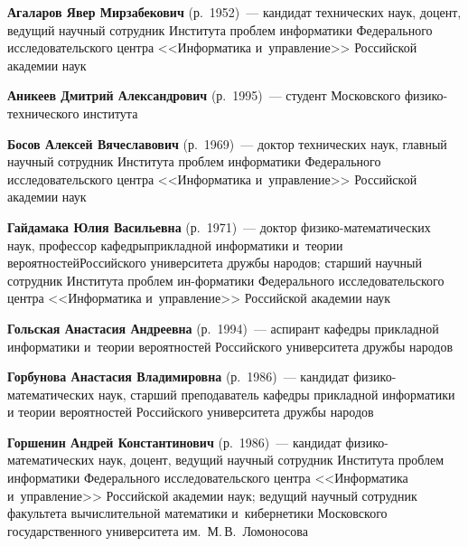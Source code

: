\begin{multicols}{2}

\noindent
\textbf{Агаларов Явер Мирзабекович} (р.\ 1952)~--- кандидат технических наук,
 доцент, ведущий научный сотрудник 
 Института проб\-лем информатики Федерального исследовательского центра 
<<Информатика и~управ\-ле\-ние>> Российской академии наук

\vspace*{6pt}

\noindent
\textbf{Аникеев Дмитрий Александрович} (р.\ 1995)~---  
студент Московского фи\-зи\-ко-тех\-ни\-че\-ско\-го института

\vspace*{6pt}


\noindent
\textbf{Босов Алексей Вячеславович} (р.\ 1969)~--- доктор технических наук, 
главный научный 
со\-труд\-ник Института проб\-лем информатики Федерального исследовательского центра 
<<Информатика и~управ\-ле\-ние>> Российской академии наук 

\vspace*{6pt}

\noindent
\textbf{Гайдамака Юлия Васильевна} (р.\ 1971)~--- доктор 
фи\-зи\-ко-ма\-те\-ма\-ти\-че\-ских наук, профессор кафед\-ры\linebreak прикладной информатики 
и~тео\-рии вероятностей\linebreak Российского университета дружбы народов; 
старший научный со\-труд\-ник Ин\-сти\-ту\-та проб\-лем ин-\linebreak форматики Федерального 
исследовательского цент\-ра <<Информатика и~управ\-ле\-ние>> Российской академии наук

\vspace*{6pt}

\noindent
\textbf{Гольская Анастасия Андреевна} (р.\ 1994)~--- 
аспирант кафедры прикладной информатики и~тео\-рии 
вероятностей Российского университета дружбы на\-родов

\vspace*{6pt}



\noindent
\textbf{Горбунова Анастасия Владимировна} (р.\ 1986)~--- 
кандидат фи\-зи\-ко-ма\-те\-ма\-ти\-че\-ских наук, старший преподаватель 
кафедры прикладной информатики и теории вероятностей Российского университета 
дружбы народов

\vspace*{6pt}

\noindent
\textbf{Горшенин Андрей Константинович} (р.\ 1986)~--- 
кандидат фи\-зи\-ко-ма\-те\-ма\-ти\-че\-ских наук, доцент, ведущий научный 
сотрудник Института проб\-лем информатики Федерального исследовательского цент\-ра 
<<Информатика и~управ\-ле\-ние>> Рос\-сий\-ской академии наук; 
ведущий научный сотрудник факультета вычислительной математики 
и~кибернетики Московского государственного университета им.\ М.\,В.~Ломоносова


\end{multicols}
